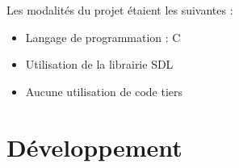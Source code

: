 \documentclass[12pt]{report}
\begin{document}
Les modalités du projet étaient les suivantes :\\
\begin{itemize}
 \item Langage de programmation : C   \\
 \item Utilisation de la librairie SDL \\
 \item Aucune utilisation de code tiers \\
\end{itemize}



\chapter{Développement} %
\end{document}
